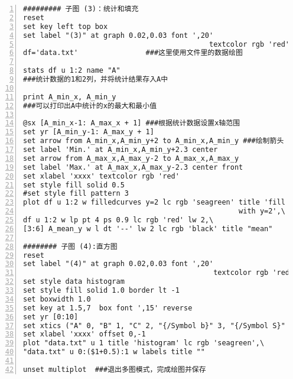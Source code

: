 \begin{lstlisting}[numbers=left,frame=single]
######### 子图 (3)：统计和填充
reset
set key left top box
set label "(3)" at graph 0.02,0.03 font ',20'  
                                            textcolor rgb 'red'
df='data.txt'                ###这里使用文件里的数据绘图

stats df u 1:2 name "A"      
###统计数据的1和2列，并将统计结果存入A中

print A_min_x, A_min_y       
###可以打印出A中统计的x的最大和最小值

@sx [A_min_x-1: A_max_x + 1] ###根据统计数据设置x轴范围
set yr [A_min_y-1: A_max_y + 1]
set arrow from A_min_x,A_min_y+2 to A_min_x,A_min_y ###绘制箭头
set label 'Min.' at A_min_x,A_min_y+2.3 center
set arrow from A_max_x,A_max_y-2 to A_max_x,A_max_y
set label 'Max.' at A_max_x,A_max_y-2.3 center front
set xlabel 'xxxx' textcolor rgb 'red'
set style fill solid 0.5 
#set style fill pattern 3
plot df u 1:2 w filledcurves y=2 lc rgb 'seagreen' title 'fill 
                                                   with y=2',\
df u 1:2 w lp pt 4 ps 0.9 lc rgb 'red' lw 2,\
[3:6] A_mean_y w l dt '--' lw 2 lc rgb 'black' title "mean"

######## 子图 (4):直方图
reset
set label "(4)" at graph 0.02,0.03 font ',20'  
                                             textcolor rgb 'red'
set style data histogram
set style fill solid 1.0 border lt -1 
set boxwidth 1.0
set key at 1.5,7  box font ',15' reverse
set yr [0:10]
set xtics ("A" 0, "B" 1, "C" 2, "{/Symbol b}" 3, "{/Symbol S}" 4)
set xlabel 'xxxx' offset 0,-1
plot "data.txt" u 1 title 'histogram' lc rgb 'seagreen',\
"data.txt" u 0:($1+0.5):1 w labels title ""

unset multiplot  ###退出多图模式，完成绘图并保存
\end{lstlisting}
\par



